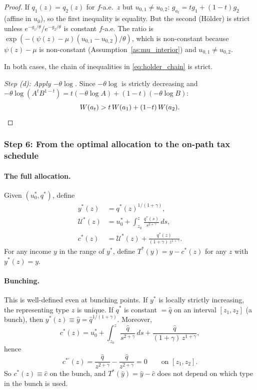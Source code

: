 \documentclass[12pt,a4paper]{article}
\theoremstyle{definition}
\theoremstyle{plain}
\theoremstyle{remark}
\newcommand{\zlow}{z_{\scriptscriptstyle 0}}
\newcommand{\calU}{\mathcal{U}}
\begin{document}
\begin{proof}
If $q_1(z) = q_2(z)$ for $f$-a.e.\ $z$ but
$u_{0,1} \neq u_{0,2}$:
$g_{a_t} = tg_1 + (1-t)g_2$ (affine in $u_0$), so the
first inequality is equality.  But the second
(H\"{o}lder) is strict unless
$e^{-g_1/\theta}/e^{-g_2/\theta}$ is constant $f$-a.e.
The ratio is
$\exp(-(\psi(z){-}\mu)(u_{0,1}{-}u_{0,2})/\theta)$,
which is non-constant because $\psi(z) - \mu$ is
non-constant (Assumption~\ref{as:mu_interior}) and
$u_{0,1} \neq u_{0,2}$.

In both cases, the chain of inequalities in
\eqref{eq:holder_chain} is strict.

\emph{Step (d): Apply $-\theta\log$.}
Since $-\theta\log$ is strictly decreasing and
$-\theta\log(A^t B^{1-t}) = t(-\theta\log A)
+ (1-t)(-\theta\log B)$:
\[
  W(a_t)
  > t\,W(a_1) + (1{-}t)\,W(a_2).\qedhere
\]
\end{proof}


\subsubsection{Step 6: From the optimal allocation to
the on-path tax schedule}

\paragraph{The full allocation.}
Given $(u_0^*, q^*)$, define
\begin{align*}
  y^*(z) &= q^*(z)^{1/(1+\gamma)}, \\
  \calU^*(z) &= u_0^* + \int_{\zlow}^z
  \frac{q^*(s)}{s^{2+\gamma}}\,ds, \\
  c^*(z) &= \calU^*(z) +
  \frac{q^*(z)}{(1+\gamma)\,z^{1+\gamma}}.
\end{align*}
For any income $y$ in the range of $y^*$, define
$T^*(y) = y - c^*(z)$ for any $z$ with $y^*(z) = y$.

\paragraph{Bunching.}
This is well-defined even at bunching points.
If $y^*$ is locally strictly increasing, the representing
type $z$ is unique.  If $q^*$ is constant $= \hat q$
on an interval $[z_1, z_2]$ (a bunch), then
$y^*(z) \equiv \hat y = \hat q^{1/(1+\gamma)}$.
Moreover,
\[
  c^*(z) = u_0^* + \int_{\zlow}^z
  \frac{\hat q}{s^{2+\gamma}}\,ds
  + \frac{\hat q}{(1+\gamma)\,z^{1+\gamma}},
\]
hence
\[
  c^{*\prime}(z)
  = \frac{\hat q}{z^{2+\gamma}}
  - \frac{\hat q}{z^{2+\gamma}} = 0
  \qquad \text{on } [z_1, z_2].
\]
So $c^*(z) \equiv \hat c$ on the bunch, and
$T^*(\hat y) = \hat y - \hat c$ does not depend on
which type in the bunch is used.
\end{document}
